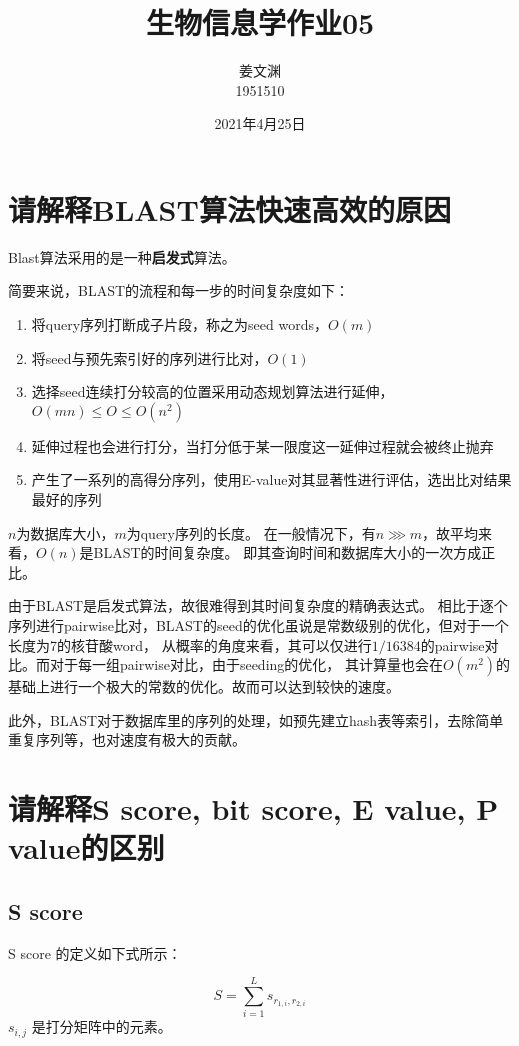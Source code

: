 \documentclass[cn,black,12pt,normal]{elegantnote}
\title{生物信息学作业05}
\author{姜文渊\\1951510}
\institute{School of Life Science, Tongji University}
\date{2021年4月25日}
\newcommand{\upcite}[1]{\textsuperscript{\textsuperscript{\cite{#1}}}}
\begin{document}
\maketitle



\section{请解释BLAST算法快速高效的原因}

Blast\upcite{altschul1990basic}算法采用的是一种\textbf{启发式}算法。

简要来说，BLAST的流程和每一步的时间复杂度如下：
\begin{enumerate}
    \item 将query序列打断成子片段，称之为seed words，$O(m)$
    \item 将seed与预先索引好的序列进行比对，$O(1)$
    \item 选择seed连续打分较高的位置采用动态规划算法进行延伸，$O(mn)\leq O\leq O(n^2)$
    \item 延伸过程也会进行打分，当打分低于某一限度这一延伸过程就会被终止抛弃
    \item 产生了一系列的高得分序列，使用E-value对其显著性进行评估，选出比对结果最好的序列
\end{enumerate}
$n$为数据库大小，$m$为query序列的长度。
在一般情况下，有$n\ggg m$，故平均来看，$O(n)$是BLAST的时间复杂度。
即其查询时间和数据库大小的一次方成正比。

由于BLAST是启发式算法，故很难得到其时间复杂度的精确表达式。
相比于逐个序列进行pairwise比对，BLAST的seed的优化虽说是常数级别的优化，但对于一个长度为7的核苷酸word，
从概率的角度来看，其可以仅进行$1/16384$的pairwise对比。而对于每一组pairwise对比，由于seeding的优化，
其计算量也会在$O(m^2)$的基础上进行一个极大的常数的优化。故而可以达到较快的速度。

此外，BLAST对于数据库里的序列的处理，如预先建立hash表等索引，去除简单重复序列等，也对速度有极大的贡献。

\section{请解释S score, bit score, E value, P value的区别}

\subsection{S score}
S score 的定义如下式所示：

\begin{equation}
S=\sum_{i=1}^{L} s_{r_{1,i},r_{2,i}}
\end{equation}
$s_{i,j}$ 是打分矩阵中的元素。
\end{document}
